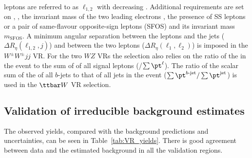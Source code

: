 \begin{table}[t!]
{leptons are referred to as $\ell_{1,2}$ with decreasing \pt. Additional requirements are set 
on \met, \meff, the invariant mass of the two leading electrons \mee, the presence of SS 
leptons or a pair of same-flavour opposite-sign leptons (SFOS) and its invariant mass $m_\text{SFOS}$. 
A minimum angular separation between the leptons and the jets ($\Delta R_\eta (\ell_{1,2}, j)$) and between the two 
leptons ($\Delta R_\eta (\ell_{1}, \ell_2)$) is imposed in the $W^\pm W^\pm jj$ VR. 
For the two $WZ$ VRs the selection also relies on the ratio of the \met in the event to the sum of \pt of all signal leptons \pt (\met/$\sum{\pt^{\ell}}$). 
The ratio of the scalar sum of the \pt of all $b$-jets to that of all jets in the event 
($\sum \pt^{b{\textrm{-jet}}} / \sum{\pt^{\textrm{jet}}}$) is used in the $\ttbar W$ VR selection.}
\label{tab:VRdef}
\end{table}

\subsection{Validation of irreducible background estimates}
\label{sec:bkg.irred.res}

The observed yields, compared with the background predictions and uncertainties, 
can be seen in Table~\ref{tab:VR_yields}. There is good agreement between data and the estimated background in all
the validation regions. 

